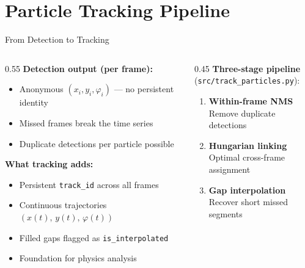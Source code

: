 
\section[Particle Tracking]{Particle Tracking Pipeline}

\begin{frame}{From Detection to Tracking}
\begin{columns}
\begin{column}{0.55\textwidth}
\textbf{Detection output (per frame):}
\begin{itemize}\small
    \item Anonymous $(x_i, y_i, \varphi_i)$ — no persistent identity
    \item Missed frames break the time series
    \item Duplicate detections per particle possible
\end{itemize}
\smallskip
\textbf{What tracking adds:}
\begin{itemize}\small
    \item Persistent \texttt{track\_id} across all frames
    \item Continuous trajectories $(x(t),\, y(t),\, \varphi(t))$
    \item Filled gaps flagged as \texttt{is\_interpolated}
    \item Foundation for physics analysis
\end{itemize}
\end{column}
\begin{column}{0.45\textwidth}
\textbf{Three-stage pipeline}\\
(\texttt{src/track\_particles.py}):
\begin{enumerate}\small
    \item \textbf{Within-frame NMS}\\
          Remove duplicate detections
    \item \textbf{Hungarian linking}\\
          Optimal cross-frame assignment
    \item \textbf{Gap interpolation}\\
          Recover short missed segments
\end{enumerate}
\end{column}
\end{columns}
\end{frame}

